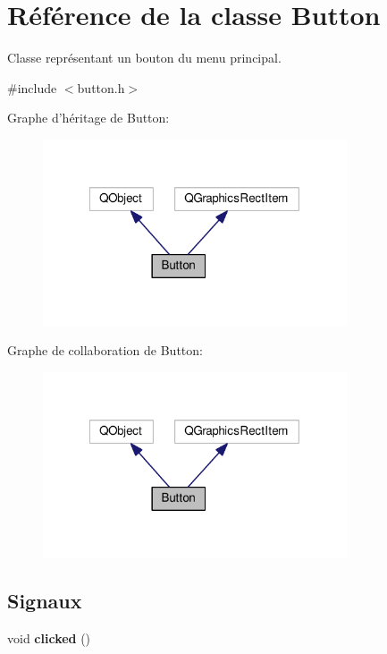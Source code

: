 \hypertarget{classButton}{\section{Référence de la classe Button}
\label{classButton}
}


Classe représentant un bouton du menu principal.  




{\ttfamily \#include $<$button.\+h$>$}



Graphe d'héritage de Button\+:\nopagebreak
\begin{figure}[H]
\begin{center}
\leavevmode
\includegraphics[width=255pt]{d5/dbb/classButton__inherit__graph}
\end{center}
\end{figure}


Graphe de collaboration de Button\+:\nopagebreak
\begin{figure}[H]
\begin{center}
\leavevmode
\includegraphics[width=255pt]{d6/dbf/classButton__coll__graph}
\end{center}
\end{figure}
\subsection*{Signaux}
\begin{DoxyCompactItemize}
\item 
\hypertarget{classButton_a9e7ab4152cb1e7e3beb7f2842f32670c}{void {\bfseries clicked} ()}\label{classButton_a9e7ab4152cb1e7e3beb7f2842f32670c}

\end{DoxyCompactItemize}
